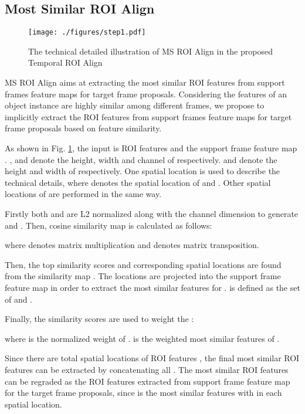 \documentclass[letterpaper]{article} \usepackage{aaai21}  \usepackage{times}  \usepackage{helvet} \usepackage{courier}  \usepackage[hyphens]{url}  \usepackage{graphicx} \usepackage{hyperref}
\begin{document}
\subsection{Most Similar ROI Align}
\begin{figure}[t]
\centering
\texttt{[image: ./figures/step1.pdf]}
\caption{The technical detailed illustration of MS ROI Align in the proposed Temporal ROI Align}
\label{fig:step1}
\vspace{-0.4cm}
\end{figure}
MS ROI Align aims at extracting the most similar ROI features from support frames feature maps for target frame proposals. Considering the features of an object instance are highly similar among different frames, we propose to implicitly extract the ROI features from support frames feature maps for target frame proposals based on feature similarity.

As shown in Fig. \ref{fig:step1}, the input is ROI features  and the support frame feature map . ,  and  denote the height, width and channel of  respectively.  and  denote the height and width of  respectively. One spatial location  is used to describe the technical details, where  denotes the spatial location of  and . Other spatial locations of  are performed in the same way.



Firstly both  and  are L2 normalized along with the channel dimension to generate  and .
Then, cosine similarity map  is calculated as follows:

where  denotes matrix multiplication and  denotes matrix transposition.

Then, the top  similarity scores  and corresponding spatial locations  are found from the similarity map .
The locations   are projected into the support frame feature map  in order to extract the most similar features   for .  is defined as the set of  and .


Finally, the similarity scores  are used to weight the :



where  is the normalized weight of .  is the weighted most similar features of .

Since there are total  spatial locations of ROI features , the final most similar ROI features  can be extracted by concatenating all .
The most similar ROI features  can be regraded as the ROI features extracted from support frame feature map  for the target frame proposals, since  is the most similar features with  in each spatial location.
\end{document}
